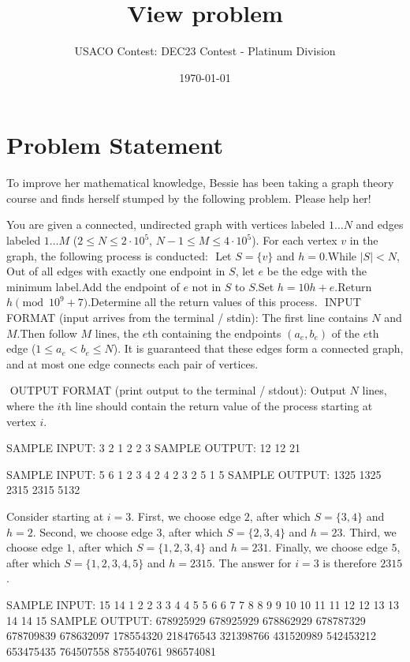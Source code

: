 \documentclass[12pt]{article}
\title{View problem}
\author{USACO Contest: DEC23 Contest - Platinum Division}
\date{\today}
\begin{document}
\maketitle

\section*{Problem Statement}


To improve her mathematical knowledge, Bessie has been taking a graph theory
course and finds herself stumped by the following problem.  Please help her!

You are given a connected, undirected graph with vertices labeled $1\dots N$ and
edges labeled $1\dots M$ ($2\le N\le 2\cdot 10^5$, $N-1\le M\le 4\cdot 10^5$).
For each vertex $v$ in the graph, the following process is conducted:
​
Let $S=\{v\}$ and $h=0$.While $|S|<N$, 
​
Out of all edges with exactly one endpoint in $S$, let $e$ be the edge with
the minimum label.Add the endpoint of $e$ not in $S$ to $S$.Set $h=10h+e$.
​
Return $h\pmod{10^9+7}$.
​
Determine all the return values of this process.
​
INPUT FORMAT (input arrives from the terminal / stdin):
The first line contains $N$ and $M$.
​
Then follow $M$ lines, the $e$th containing the endpoints $(a_e,b_e)$ of the 
$e$th edge ($1\le a_e<b_e\le N$). It is guaranteed that these edges form a
connected graph, and at most one edge connects each pair of vertices.

​
OUTPUT FORMAT (print output to the terminal / stdout):
Output $N$ lines, where the $i$th line should contain the return value of the
process starting at vertex $i$.

SAMPLE INPUT:
3 2
1 2
2 3
SAMPLE OUTPUT: 
12
12
21

SAMPLE INPUT:
5 6
1 2
3 4
2 4
2 3
2 5
1 5
SAMPLE OUTPUT: 
1325
1325
2315
2315
5132

Consider starting at $i=3$. First, we choose edge $2$, after which
$S = \{3, 4\}$ and $h = 2$. Second, we choose edge $3$, after which
$S = \{2, 3, 4\}$ and $h = 23$. Third, we choose edge $1$, after which
$S = \{1, 2, 3, 4\}$ and $h = 231$. Finally, we choose edge $5$, after which
$S = \{1, 2, 3, 4, 5\}$ and $h = 2315$. The answer for $i=3$ is therefore
$2315$.

SAMPLE INPUT:
15 14
1 2
2 3
3 4
4 5
5 6
6 7
7 8
8 9
9 10
10 11
11 12
12 13
13 14
14 15
SAMPLE OUTPUT: 
678925929
678925929
678862929
678787329
678709839
678632097
178554320
218476543
321398766
431520989
542453212
653475435
764507558
875540761
986574081
\end{document}
